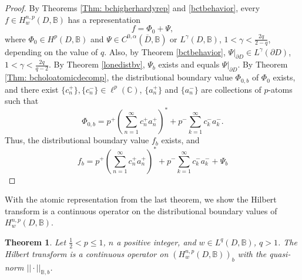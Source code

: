 \documentclass[suppldata]{interact}
\theoremstyle{plain}%
\newtheorem{theorem}{Theorem}[section]
\theoremstyle{definition}
\theoremstyle{remark}
\newcommand{\C}{\mathbb C}
\newcommand{\p}{\partial}
\newcommand{\bc}{\mathbb{B}}
\begin{document}
\begin{proof}
By Theorems \ref{Thm: bchigherhardyrep} and \ref{bctbehavior}, every $f \in H^{n,p}_{w}(D,\bc)$ has a representation 
\[
    f = \Phi_0 + \Psi,
\]
where $\Phi_0 \in H^p(D,\bc)$ and $\Psi \in C^{0,\alpha}(\overline{D},\bc)$ or $L^\gamma(D,\bc)$, $1 < \gamma< \frac{2q}{2-q}$, depending on the value of $q$. Also, by Theorem \ref{bctbehavior}, $\Psi|_{\p D} \in L^\gamma(\p D)$, $1 < \gamma< \frac{2q}{q-2}$. By Theorem \ref{lonedistbv}, $\Psi_b$ exists and equals $\Psi|_{\p D}$. By Theorem \ref{Thm: bcholoatomicdecomp},  the distributional boundary value $\Phi_{0,b}$ of $\Phi_0$ exists, and there exist $\{c_n^+\}, \{c_n^-\} \in \ell^p(\C)$, $\{a_n^+\}$ and $\{a_n^-\}$ are collections of $p$-atoms such that 
\[
    \Phi_{0,b} = p^+ \left( \sum_{n=1}^\infty c^+_n a^+_n\right)^* + p^- \sum_{k=1}^\infty c^-_k a^-_k.
\]
Thus, the distributional boundary value $f_b$ exists, and 
\[
    f_b = p^+ \left( \sum_{n=1}^\infty c^+_n a^+_n\right)^* + p^- \sum_{k=1}^\infty c^-_k a^-_k + \Psi_b
\]
\end{proof}

With the atomic representation from the last theorem, we show the Hilbert transform is a continuous operator on the distributional boundary values of $H^{n,p}_w(D,\bc)$. 

\begin{theorem}
Let $\frac{1}{2}< p \leq 1$, $n$ a positive integer, and $w \in L^q(D,\bc)$, $q>1$. The Hilbert transform is a continuous operator on $(H^{n,p}_{w}(D,\bc))_b$ with the quasi-norm $||\cdot||_{\bc,b}$.  
\end{theorem}
\end{document}
